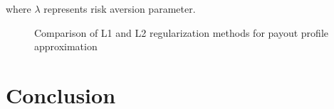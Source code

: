 \documentclass[12pt]{article}
\begin{document}
where $\lambda$ represents risk aversion parameter.

\begin{figure}[htbp]
\centering

\caption{Comparison of L1 and L2 regularization methods for payout profile approximation}
\label{fig:regularization}
\end{figure}

\section{Conclusion}



\end{document}
